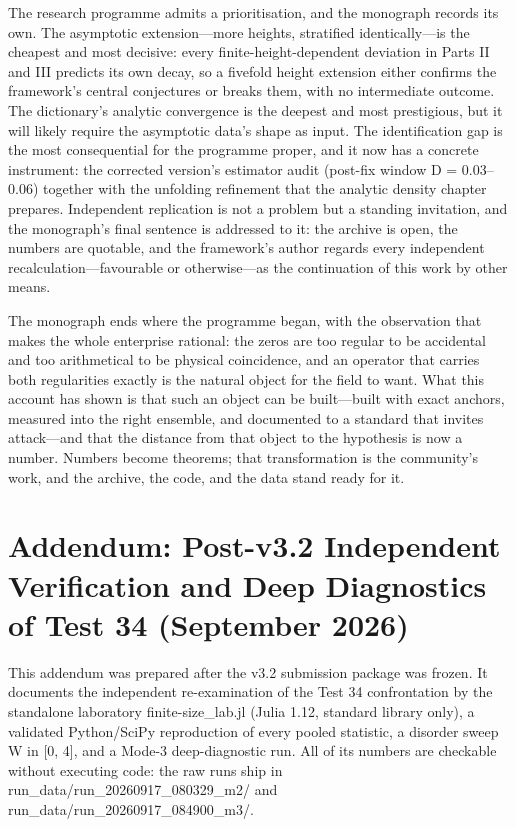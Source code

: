 \documentclass[10pt]{article}
\begin{document}
The research programme admits a prioritisation, and the monograph records its own. The asymptotic extension---more heights, stratified identically---is the cheapest and most decisive: every finite-height-dependent deviation in Parts II and III predicts its own decay, so a fivefold height extension either confirms the framework's central conjectures or breaks them, with no intermediate outcome. The dictionary's analytic convergence is the deepest and most prestigious, but it will likely require the asymptotic data's shape as input. The identification gap is the most consequential for the programme proper, and it now has a concrete instrument: the corrected version's estimator audit (post-fix window D = 0.03--0.06) together with the unfolding refinement that the analytic density chapter prepares. Independent replication is not a problem but a standing invitation, and the monograph's final sentence is addressed to it: the archive is open, the numbers are quotable, and the framework's author regards every independent recalculation---favourable or otherwise---as the continuation of this work by other means.

The monograph ends where the programme began, with the observation that makes the whole enterprise rational: the zeros are too regular to be accidental and too arithmetical to be physical coincidence, and an operator that carries both regularities exactly is the natural object for the field to want. What this account has shown is that such an object can be built---built with exact anchors, measured into the right ensemble, and documented to a standard that invites attack---and that the distance from that object to the hypothesis is now a number. Numbers become theorems; that transformation is the community's work, and the archive, the code, and the data stand ready for it.

\section{Addendum: Post-v3.2 Independent Verification and Deep Diagnostics of Test 34 (September 2026)}\label{sec:addendum}


This addendum was prepared after the v3.2 submission package was frozen. It documents the independent re-examination of the Test 34 confrontation by the standalone laboratory finite-size\_lab.jl (Julia 1.12, standard library only), a validated Python/SciPy reproduction of every pooled statistic, a disorder sweep W in [0, 4], and a Mode-3 deep-diagnostic run. All of its numbers are checkable without executing code: the raw runs ship in run\_data/run\_20260917\_080329\_m2/ and run\_data/run\_20260917\_084900\_m3/.
\end{document}
